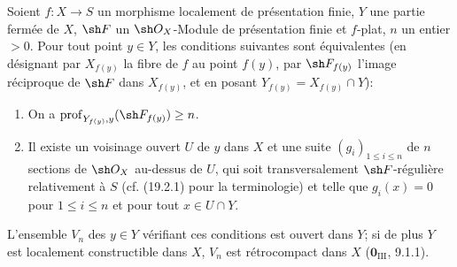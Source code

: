 \begin{proposition}[19.9.6]
\label{IV.19.9.6}
Soient $f:X\to S$ un morphisme localement de présentation finie, $Y$ une partie fermée de $X$, $\sh F$ un $\sh O_X$-Module de présentation finie et $f$-plat, $n$ un entier $>0$. Pour tout point $y\in Y$, les conditions suivantes sont équivalentes \textup{(}en désignant par $X_{f(y)}$ la fibre de $f$ au point $f(y)$, par $\sh F_{f(y)}$ l'image réciproque de $\sh F$ dans $X_{f(y)}$, et en posant $Y_{f(y)}=X_{f(y)}\cap Y$\textup{)}:
\begin{enumerate}
  \item[\textup{a)}] On a $\operatorname{prof}_{Y_{f(y)},y}(\sh F_{f(y)})\geq n$.
  \item[\textup{b)}] Il existe un voisinage ouvert $U$ de $y$ dans $X$ et une suite $(g_i)_{1\leq i\leq n}$ de $n$ sections de $\sh O_X$ au-dessus de $U$, qui soit transversalement $\sh F$-régulière relativement à $S$ \textup{(cf. (19.2.1)} pour la terminologie\textup{)} et telle que $g_i(x)=0$ pour $1\leq i\leq n$ et pour tout $x\in U\cap Y$.
\end{enumerate}

L'ensemble $V_n$ des $y\in Y$ vérifiant ces conditions est ouvert dans $Y$; si de plus $Y$ est localement constructible dans $X$, $V_n$ est rétrocompact dans $X$ \textup{($\mathbf{0}_{\mathrm{III}}$, 9.1.1)}.
\end{proposition}

